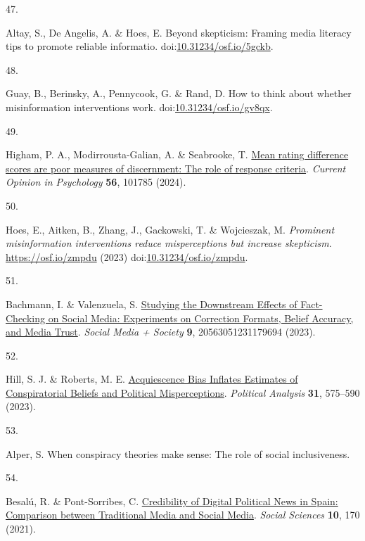 \documentclass[
  man]{apa6}
\newlength{\cslhangindent}
\newlength{\csllabelwidth}
\newenvironment{CSLReferences}[2] %
 {\begin{list}{}{%
  \setlength{\itemindent}{0pt}
  \setlength{\leftmargin}{0pt}
  \setlength{\parsep}{0pt}
  \ifodd #1
   \setlength{\leftmargin}{\cslhangindent}
   \setlength{\itemindent}{-1\cslhangindent}
  \fi
  \setlength{\itemsep}{#2\baselineskip}}}
 {\end{list}}
\newcommand{\CSLLeftMargin}[1]{\parbox[t]{\csllabelwidth}{\strut#1\strut}}
\newcommand{\CSLRightInline}[1]{\parbox[t]{\linewidth - \csllabelwidth}{\strut#1\strut}}
\begin{document}
\begin{CSLReferences}{0}{0}
\CSLLeftMargin{47. }%
\CSLRightInline{Altay, S., De Angelis, A. \& Hoes, E. Beyond skepticism: Framing media literacy tips to promote reliable informatio. doi:\href{https://doi.org/10.31234/osf.io/5gckb}{10.31234/osf.io/5gckb}.}

\CSLLeftMargin{48. }%
\CSLRightInline{Guay, B., Berinsky, A., Pennycook, G. \& Rand, D. How to think about whether misinformation interventions work. doi:\href{https://doi.org/10.31234/osf.io/gv8qx}{10.31234/osf.io/gv8qx}.}

\CSLLeftMargin{49. }%
\CSLRightInline{Higham, P. A., Modirrousta-Galian, A. \& Seabrooke, T. \href{https://doi.org/10.1016/j.copsyc.2023.101785}{Mean rating difference scores are poor measures of discernment: The role of response criteria}. \emph{Current Opinion in Psychology} \textbf{56}, 101785 (2024).}

\CSLLeftMargin{50. }%
\CSLRightInline{Hoes, E., Aitken, B., Zhang, J., Gackowski, T. \& Wojcieszak, M. \emph{Prominent misinformation interventions reduce misperceptions but increase skepticism}. \url{https://osf.io/zmpdu} (2023) doi:\href{https://doi.org/10.31234/osf.io/zmpdu}{10.31234/osf.io/zmpdu}.}

\CSLLeftMargin{51. }%
\CSLRightInline{Bachmann, I. \& Valenzuela, S. \href{https://doi.org/10.1177/20563051231179694}{Studying the Downstream Effects of Fact-Checking on Social Media: Experiments on Correction Formats, Belief Accuracy, and Media Trust}. \emph{Social Media + Society} \textbf{9}, 20563051231179694 (2023).}

\CSLLeftMargin{52. }%
\CSLRightInline{Hill, S. J. \& Roberts, M. E. \href{https://doi.org/10.1017/pan.2022.28}{Acquiescence Bias Inflates Estimates of Conspiratorial Beliefs and Political Misperceptions}. \emph{Political Analysis} \textbf{31}, 575--590 (2023).}

\CSLLeftMargin{53. }%
\CSLRightInline{Alper, S. When conspiracy theories make sense: The role of social inclusiveness.}

\CSLLeftMargin{54. }%
\CSLRightInline{Besalú, R. \& Pont-Sorribes, C. \href{https://doi.org/10.3390/socsci10050170}{Credibility of Digital Political News in Spain: Comparison between Traditional Media and Social Media}. \emph{Social Sciences} \textbf{10}, 170 (2021).}


\end{CSLReferences}
\end{document}
